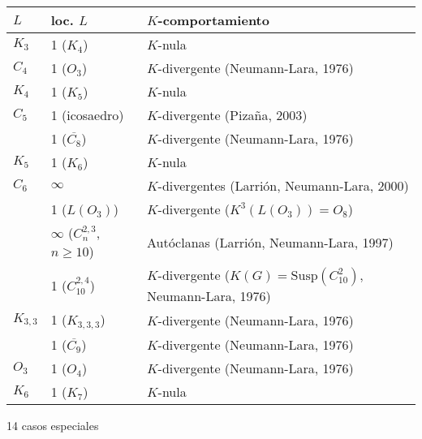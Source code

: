 \documentclass[beamer]{standalone}
\begin{document}
\SetVertexSimple[FillColor=gray, MinSize=0.7pt, InnerSep=0.7pt, LineWidth=0.5pt]


\setlength{\fboxsep}{1pt}

\begin{standaloneframe}
    \begin{center}
    \scriptsize
    \begin{tabular}{|M|M|l|}
      \hline
      $L$ & loc. $L$ & $K$-comportamiento\\
      \hline
      $K_{3}$ & 1 ($K_{4}$) & $K$-nula\\
      $C_{4}$ & 1 ($O_{3}$) & $K$-divergente (Neumann-Lara, 1976)\\
      $K_{4}$ & 1 ($K_{5}$) & $K$-nula\\
      $C_{5}$ & 1 (icosaedro) & $K$-divergente (Pizaña, 2003)\\
       & 1 ($\overline{C_{8}}$) & $K$-divergente (Neumann-Lara, 1976)\\
      $K_{5}$ & 1 ($K_{6}$) & $K$-nula\\
      $C_{6}$ & $\infty$ & $K$-divergentes (Larrión, Neumann-Lara, 2000)\\
       & 1 ($L(O_{3})$) & $K$-divergente ($K^{3}(L(O_{3}))=O_{8}$)\\
       & $\infty$ ($C_{n}^{2,3}$, $n\geq10$) & Autóclanas (Larrión, Neumann-Lara, 1997)\\
       & 1 ($C_{10}^{2,4}$) & $K$-divergente ($K(G)=\mathrm{Susp}(C^{2}_{10})$, Neumann-Lara, 1976)\\
      $K_{3,3}$ & 1 ($K_{3,3,3}$) & $K$-divergente (Neumann-Lara, 1976)\\
       & 1 ($\overline{C_{9}}$) & $K$-divergente (Neumann-Lara, 1976)\\
      $O_{3}$ & 1 ($O_{4}$) & $K$-divergente (Neumann-Lara, 1976)\\
      $K_{6}$ & 1 ($K_{7}$) & $K$-nula\\
      \hline
    \end{tabular}

    \bigskip

    14 casos especiales
  \end{center}
\end{standaloneframe}
\end{document}
